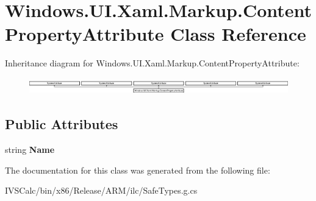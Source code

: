 \hypertarget{class_windows_1_1_u_i_1_1_xaml_1_1_markup_1_1_content_property_attribute}{}\section{Windows.\+U\+I.\+Xaml.\+Markup.\+Content\+Property\+Attribute Class Reference}
\label{class_windows_1_1_u_i_1_1_xaml_1_1_markup_1_1_content_property_attribute}
Inheritance diagram for Windows.\+U\+I.\+Xaml.\+Markup.\+Content\+Property\+Attribute\+:\begin{figure}[H]
\begin{center}
\leavevmode
\includegraphics[height=0.729642cm]{class_windows_1_1_u_i_1_1_xaml_1_1_markup_1_1_content_property_attribute}
\end{center}
\end{figure}
\subsection*{Public Attributes}
\begin{DoxyCompactItemize}
\item 
\mbox{\label{class_windows_1_1_u_i_1_1_xaml_1_1_markup_1_1_content_property_attribute_a29010188c168044ab6ddea58e32d6a0d}} 
string {\bfseries Name}
\end{DoxyCompactItemize}


The documentation for this class was generated from the following file\+:\begin{DoxyCompactItemize}
\item 
I\+V\+S\+Calc/bin/x86/\+Release/\+A\+R\+M/ilc/Safe\+Types.\+g.\+cs\end{DoxyCompactItemize}
